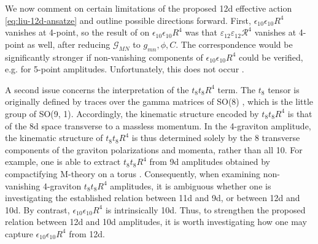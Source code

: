 We now comment on certain limitations of the proposed 12d effective action \eqref{eq:liu-12d-ansatze} and outline possible directions forward.
First, $\epsilon_{10}\epsilon_{10}R^4$ vanishes at 4-point, so the result of \cite{Minasian:2015bxa} on $\epsilon_{10}\epsilon_{10}R^4$ was that $\varepsilon_{12}\varepsilon_{12}\mathcal R^4$ vanishes at 4-point as well, after reducing $\mathcal G_{MN}$ to $g_{mn},\phi,C$.
The correspondence would be significantly stronger if non-vanishing components of $\epsilon_{10}\epsilon_{10}R^4$ could be verified, e.g. for 5-point amplitudes.
Unfortunately, this does not occur \cite{Liu:2025uqu}.

A second issue concerns the interpretation of the $t_8t_8 R^4$ term.
The $t_8$ tensor is originally defined by traces over the gamma matrices of SO(8) \cite{Schwarz:1982jn}, which is the little group of SO(9, 1).
Accordingly, the kinematic structure encoded by $t_8t_8R^4$ is that of the 8d space transverse to a massless momentum.
In the 4-graviton amplitude, the kinematic structure of $t_8t_8 R^4$ is thus determined solely by the 8 transverse components of the graviton polarizations and momenta, rather than all 10.
For example, one is able to extract $t_8t_8 R^4$ from 9d amplitudes obtained by compactifying M-theory on a torus \cite{Green:1997as}.
Consequently, when examining non-vanishing 4-graviton $t_8t_8R^4$ amplitudes, it is ambiguous whether one is investigating the established relation between 11d and 9d, or between 12d and 10d.
By contrast, $\epsilon_{10}\epsilon_{10}R^4$ is intrinsically 10d.
Thus, to strengthen the proposed relation between 12d and 10d amplitudes, it is worth investigating how one may capture $\epsilon_{10}\epsilon_{10}R^4$ from 12d.


